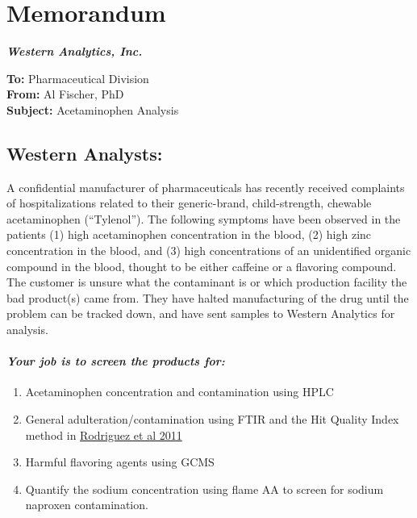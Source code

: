\documentclass[]{tufte-book}
\providecommand{\tightlist}{%
  \setlength{\itemsep}{0pt}\setlength{\parskip}{0pt}}
\begin{document}
\newpage

\hypertarget{am-memo}{%
\section*{Memorandum}\label{am-memo}}

\noindent
\textbf{\emph{Western Analytics, Inc.}}

\noindent  
\textbf{To:} Pharmaceutical Division\\
\noindent  
\textbf{From:} Al Fischer, PhD\\
\noindent  
\textbf{Subject:} Acetaminophen Analysis

\hypertarget{western-analysts-1}{%
\subsection*{Western Analysts:}\label{western-analysts-1}}

A confidential manufacturer of pharmaceuticals has recently received complaints of hospitalizations related to their generic-brand, child-strength, chewable acetaminophen (``Tylenol''). The following symptoms have been observed in the patients (1) high acetaminophen concentration in the blood, (2) high zinc concentration in the blood, and (3) high concentrations of an unidentified organic compound in the blood, thought to be either caffeine or a flavoring compound. The customer is unsure what the contaminant is or which production facility the bad product(s) came from. They have halted manufacturing of the drug until the problem can be tracked down, and have sent samples to Western Analytics for analysis.

\hypertarget{your-job-is-to-screen-the-products-for-1}{%
\paragraph{\texorpdfstring{\emph{Your job is to screen the products for:}}{Your job is to screen the products for:}}\label{your-job-is-to-screen-the-products-for-1}}

\begin{enumerate}
\def\labelenumi{\arabic{enumi}.}
\tightlist
\item
  Acetaminophen concentration and contamination using HPLC
\item
  General adulteration/contamination using FTIR and the Hit Quality Index method in \href{https://www.researchgate.net/profile/John_Clarkson6/post/What_are_some_good_reference_bands_for_Raman_spectroscopy/attachment/59d6244c79197b8077982a27/AS\%3A312109580128257\%401451424130311/download/Standardization+of+Raman+spectra+for+transfer+of+spectral+libraries+across+different+instruments.pdf}{Rodriguez et al 2011}
\item
  Harmful flavoring agents using GCMS
\item
  Quantify the sodium concentration using flame AA to screen for sodium naproxen contamination.
\end{enumerate}
\end{document}
